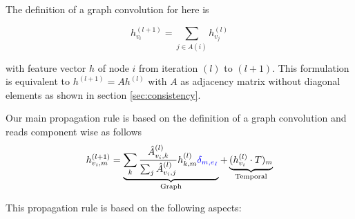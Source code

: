 \documentclass[]{article}
\begin{document}
The definition of a graph convolution for here is

\begin{equation}
	h_{v_i}^{(l+1)} = \sum_{j\in A(i)} h_{v_j}^{(l)}
\end{equation}

with feature vector $h$ of node $i$ from iteration $(l)$ to $(l+1)$. This formulation is equivalent to $h^{(l+1)} = A h^{(l)}$ with $A$ as adjacency matrix without diagonal elements as shown in section \ref{sec:consistency}.

Our main propagation rule is based on the definition of a graph convolution and reads component wise as follows
\begin{equation}
	h_{v_i, m}^{(l+1)}
	=
	\underbrace{
		\sum_k \frac{\hat{A}_{v_i, k}^{(l)}}{\sum_j \hat{A}_{v_i, j}^{(l)}} h_{k, m}^{(l)} \textcolor{blue}{\delta_{m, e_I}}
	}_{\text{Graph}}
	+
	\underbrace{
		(h_{v_i}^{(l)}\cdot T)_m
	}_{\text{Temporal}}
\end{equation}

This propagation rule is based on the following aspects:
\end{document}

